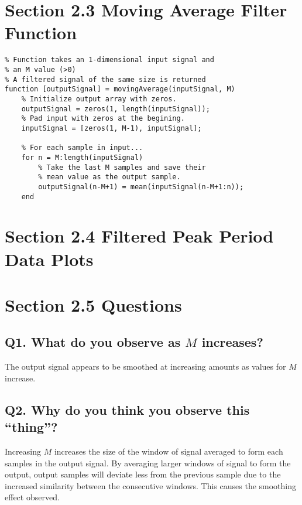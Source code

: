 \documentclass[titlepage]{scrartcl}
\begin{document}
    \section*{Section 2.3 Moving Average Filter Function}
    \begin{lstlisting}
% Function takes an 1-dimensional input signal and
% an M value (>0) 
% A filtered signal of the same size is returned
function [outputSignal] = movingAverage(inputSignal, M)
    % Initialize output array with zeros.
    outputSignal = zeros(1, length(inputSignal));
    % Pad input with zeros at the begining.
    inputSignal = [zeros(1, M-1), inputSignal];

    % For each sample in input...
    for n = M:length(inputSignal)
        % Take the last M samples and save their
        % mean value as the output sample.
        outputSignal(n-M+1) = mean(inputSignal(n-M+1:n));
    end
    \end{lstlisting}

    \section*{Section 2.4 Filtered Peak Period Data Plots}
    \begin{figure}[H]
    \end{figure}

    \section*{Section 2.5 Questions}
    \subsection*{Q1. What do you observe as $M$ increases?}
    The output signal appears to be smoothed at increasing amounts as values
    for $M$ increase.

    \subsection*{Q2. Why do you think you observe this ``thing''?}
    Increasing $M$ increases the size of the window of signal averaged to
    form each samples in the output signal. By averaging larger windows of
    signal to form the output, output samples will deviate less from the
    previous sample due to the increased similarity between the consecutive
    windows. This causes the smoothing effect observed.
\end{document}
